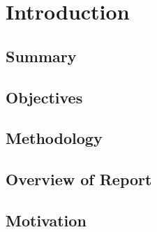 \chapter{Introduction}
\label{intro}

\section{Summary}

\section{Objectives}

\section{Methodology}

\section{Overview of Report}

\section{Motivation}